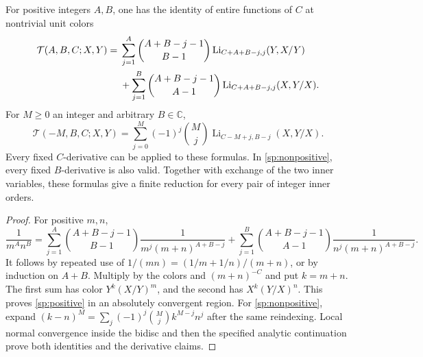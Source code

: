 \begin{theorem}
\label{sp:integer}
For positive integers $A,B$, one has the identity of entire functions
of $C$ at nontrivial unit colors
\begin{align}\label{sp:positive}
 \mathcal T(A,B,C;X,Y)
 ={}&\sum_{j=1}^{A}\binom{A+B-j-1}{B-1}
       \operatorname{Li}_{C+A+B-j,j}(Y,X/Y)\notag\\
 &+\sum_{j=1}^{B}\binom{A+B-j-1}{A-1}
       \operatorname{Li}_{C+A+B-j,j}(X,Y/X).
\end{align}
For $M\geq0$ an integer and arbitrary $B\in\mathbb C$,
\begin{equation}\label{sp:nonpositive}
 \mathcal T(-M,B,C;X,Y)
 =\sum_{j=0}^{M}(-1)^j\binom Mj
       \operatorname{Li}_{C-M+j,B-j}(X,Y/X).
\end{equation}
Every fixed $C$-derivative can be applied to these formulas.  In
\eqref{sp:nonpositive}, every fixed $B$-derivative is also valid.
Together with exchange of the two inner variables, these formulas
give a finite reduction for every pair of integer inner orders.
\end{theorem}
\begin{proof}
For positive $m,n$,
\[
 \frac1{m^A n^B}
 =\sum_{j=1}^{A}\binom{A+B-j-1}{B-1}
     \frac1{m^j(m+n)^{A+B-j}}
 +\sum_{j=1}^{B}\binom{A+B-j-1}{A-1}
     \frac1{n^j(m+n)^{A+B-j}}.
\]
It follows by repeated use of
$1/(mn)=(1/m+1/n)/(m+n)$, or by induction on $A+B$.
Multiply by the colors and $(m+n)^{-C}$ and put $k=m+n$.
The first sum has color $Y^k(X/Y)^m$, and the second has
$X^k(Y/X)^n$.  This proves \eqref{sp:positive} in an absolutely
convergent region.  For \eqref{sp:nonpositive}, expand
$(k-n)^M=\sum_j(-1)^j\binom Mj k^{M-j}n^j$ after the same reindexing.
Local normal convergence inside the bidisc and then the specified
analytic continuation prove both identities and the derivative claims.
\end{proof}

